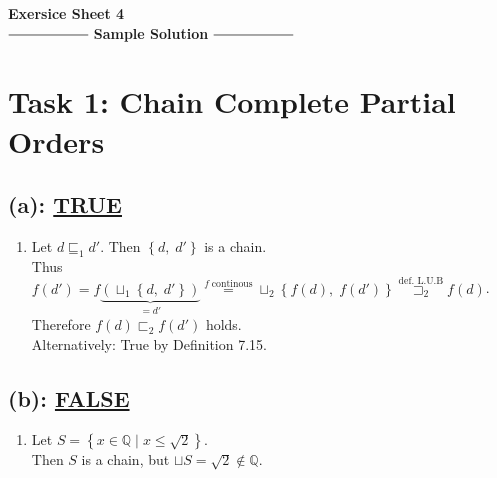 \documentclass[12pt]{scrartcl}
\begin{document}
\begin{center}
	\huge\textbf{Exersice Sheet 4}\\[0.5cm]
	
	\Large
	$\mathrel{\vcenter{\hbox{\rule{2cm}{0.5pt}}}}$ \textbf{Sample 				Solution} $\mathrel{\vcenter{\hbox{\rule{2cm}{0.5pt}}}}$\\[1cm]
\end{center}
	\large

	\section*{Task 1: Chain Complete Partial Orders}
		\subsection*{(a): \underline{TRUE}}
		\begin{enumerate}
			\item[] Let $d\sqsubseteq_{1}d'$. Then $\left\{d,\;d'\right\}$ is a chain.\\
			Thus $f\left(d'\right)=f\underbrace{\left(\sqcup_{1}\left\{d,\;d'\right\}\right)}_{=d'}\overset{f\; \text{continous}}{=}\sqcup_{2}\left\{f\left(d\right),\;f\left(d'\right)\right\}\overset{\text{def. L.U.B}}{\sqsupset_{2}}f\left(d\right)$.\\
			Therefore $f\left(d\right)\sqsubset_{2}f\left(d'\right)$ holds.\\
			Alternatively: True by Definition 7.15.
		\end{enumerate}
		
		\subsection*{(b): \underline{FALSE}}
		\begin{enumerate}
			\item[] Let $S=\left\{x\in\mathbb{Q}\; |\; x\leq\sqrt{2}\right\}$.\\
			Then $S$ is a chain, but $\sqcup S=\sqrt{2}\not\in \mathbb{Q}$.
		\end{enumerate}
		
\end{document}

